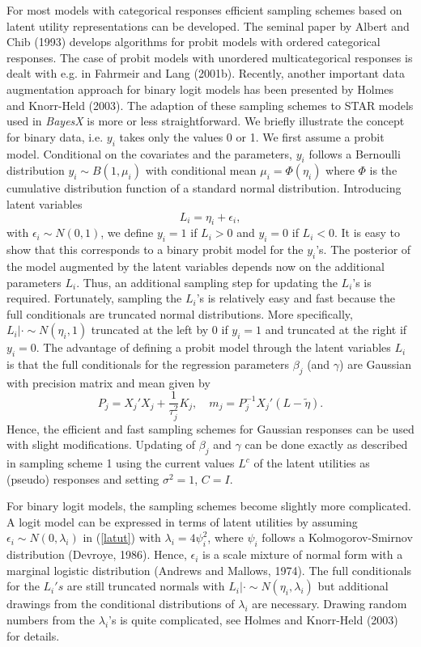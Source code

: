 \documentclass[11pt,a4paper,twoside]{bayesxarticle}
\begin{document}
For most models with categorical responses efficient sampling
schemes based on latent utility representations can be developed.
The seminal paper by Albert and Chib (1993) develops algorithms
for probit models  with  ordered categorical responses. The case
of probit models with unordered multicategorical responses is
dealt with e.g. in Fahrmeir and Lang (2001b). Recently, another
important data augmentation approach for binary logit models has
been presented by Holmes and Knorr-Held (2003). The adaption of
these sampling schemes to STAR models used in {\em BayesX} is more
or less straightforward. We briefly illustrate the concept for
binary data, i.e. $y_i$ takes only the values 0 or 1. We first
assume a probit model. Conditional on the covariates and the
parameters, $y_i$ follows a Bernoulli distribution $y_i \sim
B(1,\mu_i)$ with conditional mean $\mu_i = \Phi(\eta_i)$ where
$\Phi$ is the cumulative distribution function of a standard
normal distribution. Introducing latent variables
\begin{equation}
\label{latut} L_i = \eta_i + \epsilon_i,
\end{equation}
with $\epsilon_i \sim N(0,1)$, we define $y_i = 1$ if $L_i > 0$
and $y_i=0$ if $L_i < 0$. It is easy to show that this corresponds
to a binary probit model for the $y_i$'s. The posterior of the
model augmented by the latent variables depends now on the
additional parameters $L_i$. Thus, an additional sampling step for
updating the $L_i$'s is required. Fortunately, sampling the
$L_i$'s is relatively easy and fast because the full conditionals
are truncated normal distributions. More specifically, $L_i |
\cdot \sim N(\eta_i,1)$ truncated at the left by 0 if $y_i=1$ and
truncated at the right if $y_i=0$. The advantage of defining a
probit model through the latent variables $L_i$ is that the full
conditionals for the regression parameters $\beta_j$ (and
$\gamma$) are Gaussian with precision matrix and mean given by
\begin{equation}
\label{prec2} P_j = X_j'X_j + \frac{1}{\tau^2_j}K_j, \quad m_j =
P_j^{-1}X_j'(L-\tilde{\eta}).
\end{equation}
Hence, the efficient and fast sampling schemes for Gaussian
responses can be used with slight modifications. Updating of
$\beta_j$ and $\gamma$ can be done exactly as described in
sampling scheme 1  using the current values $L^c$ of the latent
utilities as (pseudo) responses and setting $\sigma^2=1$, $C=I$.

For binary logit models, the sampling schemes become slightly more
complicated. A logit model can be expressed in terms of latent
utilities by assuming $\epsilon_i \sim N(0,\lambda_i)$ in
(\ref{latut}) with $\lambda_i = 4\psi_i^2$, where $\psi_i$ follows
a Kolmogorov-Smirnov distribution (Devroye, 1986). Hence,
$\epsilon_i$ is  a scale mixture of normal form with a marginal
logistic distribution (Andrews and Mallows, 1974). The full
conditionals for the $L_i's$ are still truncated normals with $L_i
| \cdot \sim N(\eta_i,\lambda_i)$ but additional drawings from the
conditional distributions of $\lambda_i$ are necessary. Drawing
random numbers from the $\lambda_i$'s is quite complicated, see
Holmes and Knorr-Held (2003) for details.
\end{document}
